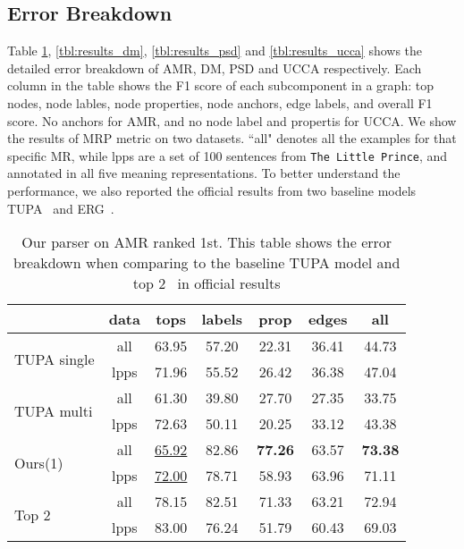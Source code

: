 \subsection{Error Breakdown}
\label{ssec:error_breakdown}
Table \ref{tbl:results_amr}, \ref{tbl:results_dm},
\ref{tbl:results_psd} and \ref{tbl:results_ucca} shows the detailed
error breakdown of AMR, DM, PSD and UCCA respectively. Each column in
the table shows the F1 score of each subcomponent in a graph: top
nodes, node lables, node properties, node anchors, edge labels, and
overall F1 score. No anchors for AMR, and no node label and propertis
for UCCA. We show the results of MRP metric on two datasets. ``all"
denotes all the examples for that specific MR, while lpps are a set of
100 sentences from \texttt{The Little Prince}, and annotated in all five
meaning representations. To better understand the performance, we also
reported the official results from two baseline models
TUPA~\cite{Her:Arv:19} and ERG~\cite{Oep:Fli:19}.

\begin{table}[!ht]
\small
\centering
\setlength{\tabcolsep}{3pt}
\begin{tabular}{lcccccc}
\toprule
                          & data & tops              & labels & prop  & edges & all   \\ \hline
\multirow{2}{*}{ \parbox{1cm}{TUPA
single} }                 & all  & 63.95             & 57.20  & 22.31 & 36.41 & 44.73 \\
                          & lpps & 71.96             & 55.52  & 26.42 & 36.38 & 47.04 \\ \hline
\multirow{2}{*}{ \parbox{1cm}{TUPA
multi} }                  & all  & 61.30             & 39.80  & 27.70 & 27.35 & 33.75 \\
                          & lpps & 72.63             & 50.11  & 20.25 & 33.12 & 43.38 \\ \hline
\multirow{2}{*}{ Ours(1)} & all  & \underline{65.92} & 82.86  & {\bf 77.26} & 63.57 & {\bf 73.38} \\
                          & lpps & \underline{72.00} & 78.71  & 58.93 & 63.96 & 71.11 \\ \hline
\multirow{2}{*}{ Top 2}  & all  & 78.15             & 82.51  & 71.33 & 63.21 & 72.94 \\
                          & lpps & 83.00             & 76.24  & 51.79 & 60.43 & 69.03 \\ \bottomrule
\end{tabular}
\caption{\label{tbl:results_amr} Our parser on AMR ranked 1st. This table shows the error breakdown when comparing to the baseline TUPA model and top 2~\cite{Che:Dou:Xu:19} in official results}
\end{table}


